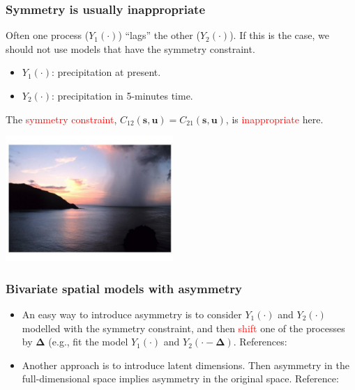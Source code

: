 \documentclass{beamer}
\newcommand{\Deltab} {\boldsymbol{\Delta}}
\newcommand{\s}{\mathbf{s}}
\renewcommand{\u}{\mathbf{u}}
\begin{document}

\begin{frame}
\frametitle{Symmetry is usually inappropriate}
Often one process ($Y_{1}(\cdot)$) ``lags'' the other ($Y_2(\cdot)$). If this is the case, we should not use models that have the symmetry constraint.
\begin{itemize}
\item $Y_1(\cdot)$: precipitation at present.
\item $Y_2(\cdot)$: precipitation in 5-minutes time.
\end{itemize}
The \textcolor{red}{symmetry constraint}, $C_{12}(\s,\u)=C_{21}(\s,\u)$, is \textcolor{red}{inappropriate} here.
\vspace{-0.5cm}

\begin{center}
\includegraphics[width=2.5in]{rain.png}
\end{center}
\end{frame}


\begin{frame}
\frametitle{Bivariate spatial models with asymmetry}

\begin{itemize}
\item An easy way to introduce asymmetry is to consider $Y_1(\cdot)$ and $Y_2(\cdot)$ modelled with the symmetry constraint, and then \textcolor{red}{shift} one of the processes by $\Deltab$ (e.g., fit the model $Y_1(\cdot)$ and $Y_2(\cdot-\Deltab)$. 
\newline References: \cite{VerHoefCressie1993,ChristensenAmemiya2001,ChristensenAmemiya2002,Li_2011}
\vfill
\item Another approach is to introduce latent dimensions. Then asymmetry in the full-dimensional space implies asymmetry in the original space. Reference:~\cite{Apanasovich_2010}
\end{itemize}
\vfill
\end{frame}
\end{document}
